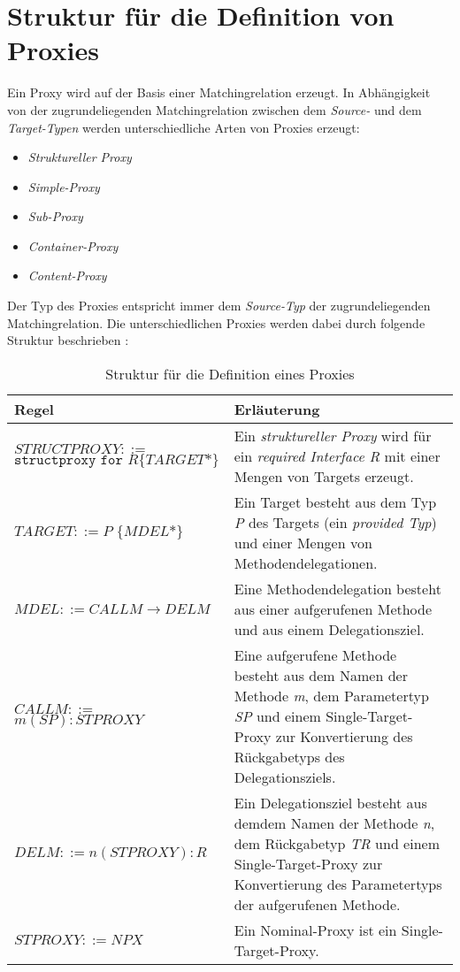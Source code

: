 \documentclass[a4paper,12pt]{article}
\begin{document}
\section{Struktur für die Definition von Proxies}
Ein Proxy wird auf der Basis einer Matchingrelation erzeugt. In Abhängigkeit von der zugrundeliegenden Matchingrelation zwischen dem \emph{Source-} und dem \emph{Target-Typen} werden unterschiedliche Arten von Proxies erzeugt:
\begin{itemize}
\item \emph{Struktureller Proxy}
\item \emph{Simple-Proxy}
\item \emph{Sub-Proxy}
\item \emph{Container-Proxy}
\item \emph{Content-Proxy}
\end{itemize}
Der Typ des Proxies entspricht immer dem \emph{Source-Typ} der zugrundeliegenden Matchingrelation. Die unterschiedlichen Proxies werden dabei durch folgende Struktur beschrieben :
\begin{table}[H]
\centering
\begin{tabular}{|p{6cm}|p{8cm}|}
\hline
\hline
\centering\textbf{Regel} & \textbf{Erläuterung} \\
\hline
\hline
$\mathit{STRUCTPROXY} ::=$\newline $\texttt{structproxy } \texttt{for } R$\newline$ \texttt{\{}TARGET\text{*}\texttt{\}}$ & Ein \emph{struktureller Proxy} wird für ein \emph{required Interface R} mit einer Mengen von Targets erzeugt.  \\
\hline
$\mathit{TARGET} ::=$\newline $P \texttt{ \{}MDEL\text{*}\texttt{\}}$ & Ein Target besteht aus dem Typ \emph{P} des Targets (ein \emph{provided Typ}) und einer Mengen von Methodendelegationen.\\
\hline
$\mathit{MDEL} ::= CALLM \rightarrow DELM $  & Eine Methodendelegation besteht aus einer aufgerufenen Methode und aus einem Delegationsziel.\\
\hline
$\mathit{CALLM} ::=$\newline $m(SP):STPROXY $  & Eine aufgerufene Methode besteht aus dem Namen der Methode \emph{m}, dem Parametertyp \emph{SP} und einem Single-Target-Proxy zur Konvertierung des Rückgabetyps des Delegationsziels.\\
\hline
$\mathit{DELM} ::=$\newline $n(STPROXY):R $  & Ein Delegationsziel besteht aus demdem Namen der Methode \emph{n}, dem Rückgabetyp \emph{TR} und einem Single-Target-Proxy zur Konvertierung des Parametertyps der aufgerufenen Methode.\\
\hline
$\mathit{STPROXY} ::= NPX$ & Ein Nominal-Proxy ist ein Single-Target-Proxy.\\


\hline
\end{tabular}
\caption{Struktur für die Definition eines Proxies}
 \label{tab:eIShort}
\end{table}
\end{document}
